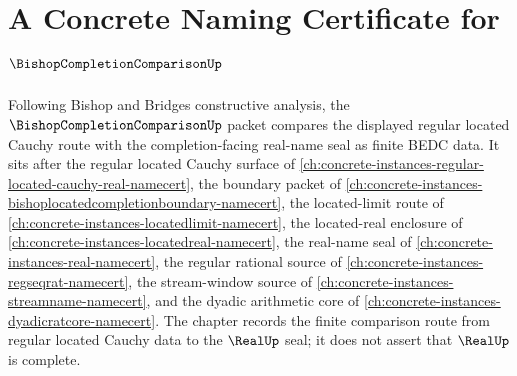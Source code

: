 \chapter{A Concrete Naming Certificate for $\BishopCompletionComparisonUp$}
\label{ch:concrete-instances-bishopcompletioncomparison-namecert}

Following Bishop and Bridges constructive analysis, the $\BishopCompletionComparisonUp$ packet compares the displayed regular located Cauchy route with the completion-facing real-name seal as finite BEDC data. It sits after the regular located Cauchy surface of \autoref{ch:concrete-instances-regular-located-cauchy-real-namecert}, the boundary packet of \autoref{ch:concrete-instances-bishoplocatedcompletionboundary-namecert}, the located-limit route of \autoref{ch:concrete-instances-locatedlimit-namecert}, the located-real enclosure of \autoref{ch:concrete-instances-locatedreal-namecert}, the real-name seal of \autoref{ch:concrete-instances-real-namecert}, the regular rational source of \autoref{ch:concrete-instances-regseqrat-namecert}, the stream-window source of \autoref{ch:concrete-instances-streamname-namecert}, and the dyadic arithmetic core of \autoref{ch:concrete-instances-dyadicratcore-namecert}. The chapter records the finite comparison route from regular located Cauchy data to the $\RealUp$ seal; it does not assert that $\RealUp$ is complete.

